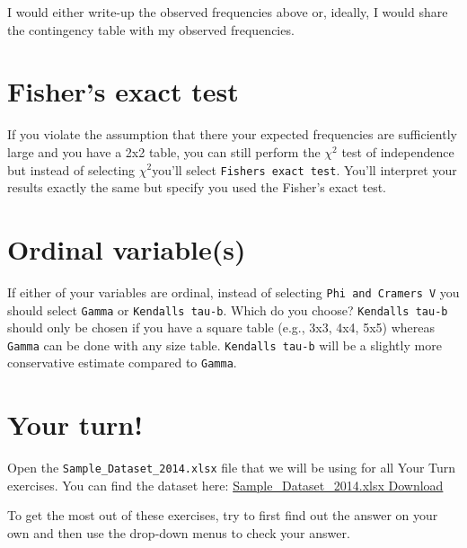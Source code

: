 \documentclass[
]{book}
\begin{document}
I would either write-up the observed frequencies above or, ideally, I would share the contingency table with my observed frequencies.

\hypertarget{fishers-exact-test}{%
\section{Fisher's exact test}\label{fishers-exact-test}}

If you violate the assumption that there your expected frequencies are sufficiently large and you have a 2x2 table, you can still perform the \(\chi^2\) test of independence but instead of selecting \(\chi^2\)you'll select \texttt{Fisher\textquotesingle{}s\ exact\ test}. You'll interpret your results exactly the same but specify you used the Fisher's exact test.

\hypertarget{ordinal-variables}{%
\section{Ordinal variable(s)}\label{ordinal-variables}}

If either of your variables are ordinal, instead of selecting \texttt{Phi\ and\ Cramer\textquotesingle{}s\ V} you should select \texttt{Gamma} or \texttt{Kendall\textquotesingle{}s\ tau-b}. Which do you choose? \texttt{Kendall\textquotesingle{}s\ tau-b} should only be chosen if you have a square table (e.g., 3x3, 4x4, 5x5) whereas \texttt{Gamma} can be done with any size table. \texttt{Kendall\textquotesingle{}s\ tau-b} will be a slightly more conservative estimate compared to \texttt{Gamma}.

\hypertarget{your-turn-3}{%
\section{Your turn!}\label{your-turn-3}}

Open the \texttt{Sample\_Dataset\_2014.xlsx} file that we will be using for all Your Turn exercises. You can find the dataset here: \href{https://github.com/danawanzer/stats-with-jamovi/blob/master/data/Sample_Dataset_2014.xlsx}{Sample\_Dataset\_2014.xlsx Download}

To get the most out of these exercises, try to first find out the answer on your own and then use the drop-down menus to check your answer.
\end{document}
